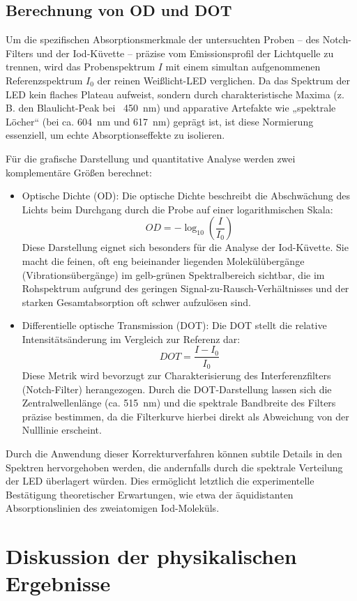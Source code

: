 \documentclass[10pt,a4paper]{article}
\begin{document}
\subsection{Berechnung von OD und DOT}

Um die spezifischen Absorptionsmerkmale der untersuchten Proben – des Notch-Filters und der Iod-Küvette – präzise vom Emissionsprofil der Lichtquelle zu trennen, wird das Probenspektrum $I$ mit einem simultan aufgenommenen Referenzspektrum $I_0$ der reinen Weißlicht-LED verglichen. Da das Spektrum der LED kein flaches Plateau aufweist, sondern durch charakteristische Maxima (z. B. den Blaulicht-Peak bei ~\qty{450}{nm}) und apparative Artefakte wie „spektrale Löcher“ (bei ca. \qty{604}{nm} und \qty{617}{nm}) geprägt ist, ist diese Normierung essenziell, um echte Absorptionseffekte zu isolieren.

Für die grafische Darstellung und quantitative Analyse werden zwei komplementäre Größen berechnet:
\begin{itemize}
       \item Optische Dichte (OD): Die optische Dichte beschreibt die Abschwächung des Lichts beim Durchgang durch die Probe auf einer logarithmischen Skala: $$OD = -\log_{10}\left(\frac{I}{I_0}\right)$$ Diese Darstellung eignet sich besonders für die Analyse der Iod-Küvette. Sie macht die feinen, oft eng beieinander liegenden Molekülübergänge (Vibrationsübergänge) im gelb-grünen Spektralbereich sichtbar, die im Rohspektrum aufgrund des geringen Signal-zu-Rausch-Verhältnisses und der starken Gesamtabsorption oft schwer aufzulösen sind.
       \item Differentielle optische Transmission (DOT): Die DOT stellt die relative Intensitätsänderung im Vergleich zur Referenz dar: $$DOT = \frac{I - I_0}{I_0}$$ Diese Metrik wird bevorzugt zur Charakterisierung des Interferenzfilters (Notch-Filter) herangezogen. Durch die DOT-Darstellung lassen sich die Zentralwellenlänge (ca. \qty{515}{nm}) und die spektrale Bandbreite des Filters präzise bestimmen, da die Filterkurve hierbei direkt als Abweichung von der Nulllinie erscheint.
\end{itemize}
Durch die Anwendung dieser Korrekturverfahren können subtile Details in den Spektren hervorgehoben werden, die andernfalls durch die spektrale Verteilung der LED überlagert würden. Dies ermöglicht letztlich die experimentelle Bestätigung theoretischer Erwartungen, wie etwa der äquidistanten Absorptionslinien des zweiatomigen Iod-Moleküls.

\section{Diskussion der physikalischen Ergebnisse}
\end{document}

